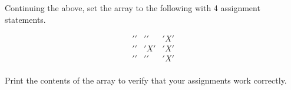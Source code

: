 \begin{ex}
Continuing the above, set the array to the following with 4 assignment statements.

\begin{align*}
' ' & ' ' & 'X' \\
' ' & 'X' & 'X' \\
' ' & ' ' & 'X' \\
\end{align*}

Print the contents of the array to verify that your assignments work
correctly.
\end{ex}
